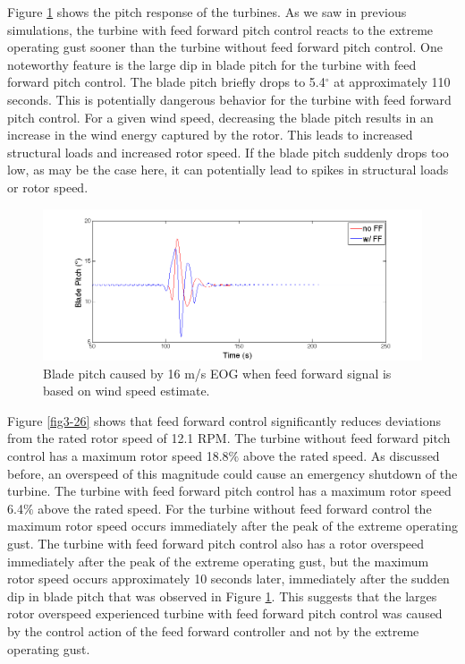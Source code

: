 Figure \ref{fig3-25} shows the pitch response of the turbines. As we saw in previous simulations, the turbine with feed forward pitch control reacts to the extreme operating gust sooner than the turbine without feed forward pitch control. One noteworthy feature is the large dip in blade pitch for the turbine with feed forward pitch control. The blade pitch briefly drops to 5.4$^\circ$ at approximately 110 seconds. This is potentially dangerous behavior for the turbine with feed forward pitch control. For a given wind speed, decreasing the blade pitch results in an increase in the wind energy captured by the rotor. This leads to increased structural loads and increased rotor speed. If the blade pitch suddenly drops too low, as may be the case here, it can potentially lead to spikes in structural loads or rotor speed. 

\begin{figure}[htb]
	\centering
		\includegraphics[width = \linewidth]{Figures/ch3Figures/fig3-25.png}
		
	\caption{Blade pitch caused by 16 m/s EOG when feed forward signal is based on wind speed estimate.}
	\label{fig3-25}
\end{figure}

Figure \ref{fig3-26} shows that feed forward control significantly reduces deviations from the rated rotor speed of 12.1 RPM. The turbine without feed forward pitch control has a maximum rotor speed 18.8$\%$ above the rated speed. As discussed before, an overspeed of this magnitude could cause an emergency shutdown of the turbine. The turbine with feed forward pitch control has a maximum rotor speed 6.4$\%$ above the rated speed. For the turbine without feed forward control the maximum rotor speed occurs immediately after the peak of the extreme operating gust. The turbine with feed forward pitch control also has a rotor overspeed immediately after the peak of the extreme operating gust, but the maximum rotor speed occurs approximately 10 seconds later, immediately after the sudden dip in blade pitch that was observed in Figure \ref{fig3-25}. This suggests that the larges rotor overspeed experienced turbine with feed forward pitch control was caused by the control action of the feed forward controller and not by the extreme operating gust.

